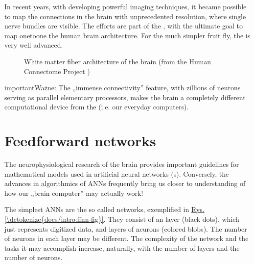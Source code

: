 \documentclass[a4paper,12pt,polish]{jupyterBook}
\let\sphinxpxdimen\pdfpxdimen\else\newdimen\sphinxpxdimen
\begin{document}
\sphinxAtStartPar
In recent years, with developing powerful imaging techniques, it became possible to map the connections in the brain with unprecedented resolution, where single nerve bundles are visible. The efforts are part of the , with the ultimate goal to map one\sphinxhyphen{}to\sphinxhyphen{}one the human brain architecture. For the much simpler fruit fly, the  is very well advanced.

\begin{figure}[htbp]
\centering
\capstart

\noindent\sphinxincludegraphics[width=280\sphinxpxdimen]{{brain}.jpg}
\caption{White matter fiber architecture of the brain (from the Human Connectome Project )}\label{\detokenize{docs/intro:connectome-fig}}\end{figure}

\begin{sphinxadmonition}{important}{Ważne:}
\sphinxAtStartPar
The „immense connectivity” feature, with zillions of neurons serving as parallel elementary processors, makes the brain a completely different computational device from the  (i.e. our everyday computers).
\end{sphinxadmonition}


\section{Feed\sphinxhyphen{}forward networks}
\label{\detokenize{docs/intro:feed-forward-networks}}
\sphinxAtStartPar
The neurophysiological research of the brain provides important guidelines for mathematical models used in artificial neural networks (s). Conversely, the advances in algorithmics of ANNs frequently bring us closer to understanding of how our „brain computer” may actually work!

\sphinxAtStartPar
The simplest ANNs are the so called  networks, exemplified in \hyperref[\detokenize{docs/intro:ffnn-fig}]{Rys.\@ \ref{\detokenize{docs/intro:ffnn-fig}}}. They consist of an  layer (black dots), which just represents digitized data, and layers of neurons (colored blobs). The number of neurons in each layer may be different. The complexity of the network and the tasks it may accomplish increase, naturally, with the number of layers and the number of neurons.
\end{document}
